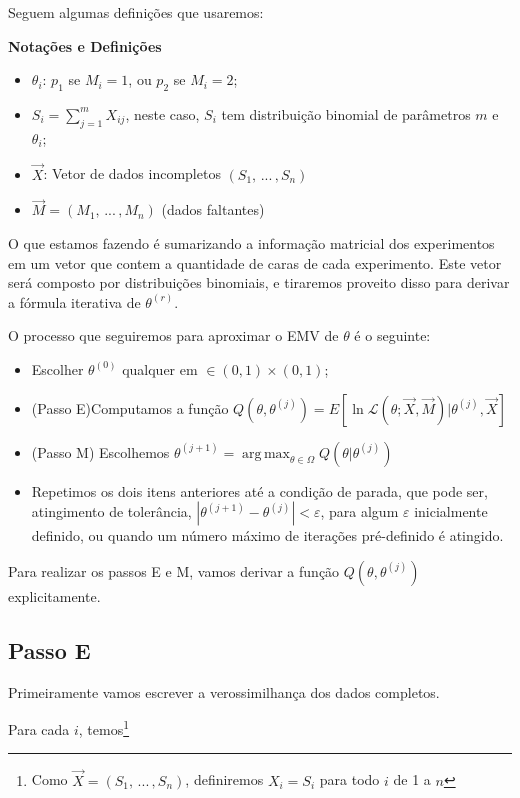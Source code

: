 \documentclass[12pt]{article}
\newcommand{\lik}{\mathcal{L}}
\DeclareMathOperator*{\argmax}{arg\,max} %
\begin{document}
Seguem algumas definições que usaremos:

\textbf{Notações e Definições}
\begin{itemize}
    \item $\theta_i$: $p_1$ se $M_i=1$, ou $p_2$ se $M_i=2$;
    \item $S_i=\sum_{j=1}^mX_{ij}$, neste caso, $S_i$ tem distribuição binomial de parâmetros $m$ e $\theta_i$;
    \item $\vec X$: Vetor de dados incompletos $(S_1,\,...\,,S_n)$ 
    \item $\vec M = (M_1,\,...\,,M_n)$ (dados faltantes)
\end{itemize}

O que estamos fazendo é sumarizando a informação matricial dos experimentos em um vetor que contem a quantidade de caras de cada experimento. Este vetor será composto por distribuições binomiais, e tiraremos proveito disso para derivar a fórmula iterativa de $\theta^{(r)}$.

O processo que seguiremos para aproximar o EMV de $\theta$ é o seguinte:

\begin{itemize}
    \item Escolher $\theta^{(0)}$ qualquer em $\in (0,1)\times (0,1)$;
    \item (Passo E)Computamos a função $Q(\theta,\theta^{(j)})=E[\ln \lik (\theta;\vec X, \vec M)|\theta^{(j)},\vec X]$
    \item (Passo M) Escolhemos $\displaystyle \theta^{(j+1)} = \argmax_{\theta\in\Omega}Q(\theta|\theta^{(j)})$
    \item Repetimos os dois itens anteriores até a condição de parada, que pode ser, atingimento de tolerância, $|\theta^{(j+1)}-\theta^{(j)}|<\varepsilon$, para algum $\varepsilon$ inicialmente definido, ou quando um número máximo de iterações pré-definido é atingido.
\end{itemize}

Para realizar os passos E e M, vamos derivar a função $Q(\theta,\theta^{(j)})$ explicitamente.

\subsection{Passo E}

Primeiramente vamos escrever a verossimilhança dos dados completos.

Para cada $i$, temos\footnote{Como $\vec X = (S_1,\,...\,,S_n)$, definiremos $X_i=S_i$ para todo $i$ de 1 a $n$}
\end{document}

